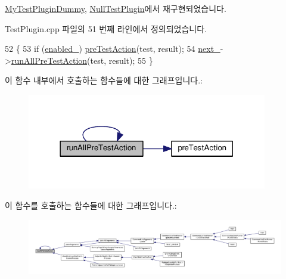\hyperlink{class_my_test_plugin_dummy_a00955a64ac9db4a19e3bcd68861ce72f}{My\+Test\+Plugin\+Dummy}, \hyperlink{class_null_test_plugin_ac0a34d45612b2e5e870bfe8d2929a75a}{Null\+Test\+Plugin}에서 재구현되었습니다.



Test\+Plugin.\+cpp 파일의 51 번째 라인에서 정의되었습니다.


\begin{DoxyCode}
52 \{
53     \textcolor{keywordflow}{if} (\hyperlink{class_test_plugin_ab6dfcb3e6c79f4def1295fea7f0de8c0}{enabled\_}) \hyperlink{class_test_plugin_aeb3d3b5a9cbcca6f8f4225bb29554ea2}{preTestAction}(test, result);
54     \hyperlink{class_test_plugin_a9461650e936ee3765377081fb8bc15dc}{next\_}->\hyperlink{class_test_plugin_aa3524b10b0f1613104fa75f1c1a72cf6}{runAllPreTestAction}(test, result);
55 \}
\end{DoxyCode}


이 함수 내부에서 호출하는 함수들에 대한 그래프입니다.\+:
\nopagebreak
\begin{figure}[H]
\begin{center}
\leavevmode
\includegraphics[width=297pt]{class_test_plugin_aa3524b10b0f1613104fa75f1c1a72cf6_cgraph}
\end{center}
\end{figure}




이 함수를 호출하는 함수들에 대한 그래프입니다.\+:
\nopagebreak
\begin{figure}[H]
\begin{center}
\leavevmode
\includegraphics[width=350pt]{class_test_plugin_aa3524b10b0f1613104fa75f1c1a72cf6_icgraph}
\end{center}
\end{figure}




